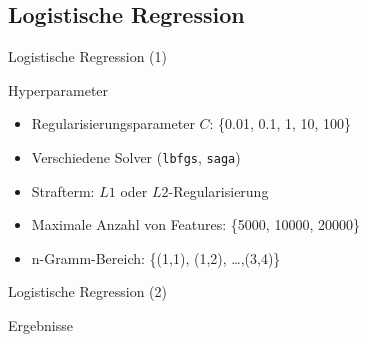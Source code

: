 \documentclass[aspectratio=169]{beamer} %
\begin{document}
\subsection{Logistische Regression}

\begin{frame}{Logistische Regression (1)}
    \begin{block}{Hyperparameter}             
        \begin{itemize}
            \item Regularisierungsparameter \(C\): \{0.01, 0.1, 1, 10, 100\}
            
            \item Verschiedene Solver (\texttt{lbfgs}, \texttt{saga})

            \item Strafterm: \(L1\) oder \(L2\)-Regularisierung
            
            \item Maximale Anzahl von Features: \{5000, 10000, 20000\}
            
            \item n-Gramm-Bereich: \{(1,1), (1,2), \dots ,(3,4)\}
        \end{itemize}
    \end{block}
\end{frame}

\begin{frame}{Logistische Regression (2)}
    \begin{block}{Ergebnisse}
        \begin{figure}
            \centering
            
            \qquad
        \end{figure}
    \end{block}
\end{frame}
\end{document}
